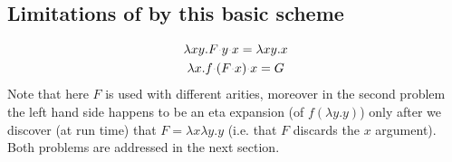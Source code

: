 \documentclass[sigconf,natbib=false,review]{acmart}
\newcommand{\appsep}{\ensuremath{\textcolor{lightgray}{\cdot}}}
\newcommand{\UnifRel}{\ensuremath{\simeq}}
\newcommand{\Uo}{\ensuremath{\UnifRel_o}\xspace}
\newcommand{\Ue}{\ensuremath{\UnifRel_\lambda}\xspace}
\begin{document}
\subsection{Limitations of by this basic scheme}
\label{sec:basic-comp-limitations}

\begin{gather}
\lambda x y.F \appsep y \appsep x = \lambda x y.x \label{eq:unif-eta1}\\
\lambda x. f \appsep (F \appsep x) \appsep x = G \label{eq:unif-eta2}
\end{gather}
Note that here $F$ is used with different arities, moreover
in the second problem the left hand side happens to be an
eta expansion (of $f (\lambda y.y)$) only after we discover (at run time)
that $F = \lambda x\lambda y.y$ (i.e. that $F$ discards the $x$ argument).
Both problems are addressed in the next section.
  





\end{document}
